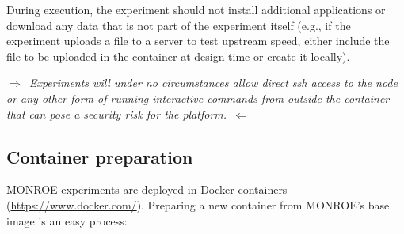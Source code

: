 \documentclass[a4paper,10pt]{article}
\newcommand{\monroe}{MONROE}
\begin{document}
During execution, the experiment should not install additional applications or download any data that is not part of the experiment itself (e.g., if the experiment uploads a file to a server to test upstream speed, either include the file to be uploaded in the container at design time or create it locally).

\emph{$\Rightarrow$~Experiments will under no circumstances allow direct ssh access to the node or any other form of running interactive commands from outside the container that can pose a security risk for the platform.~$\Leftarrow$}

\subsection{Container preparation}
\label{subsec:containerPreparation}

\monroe{} experiments are deployed in Docker containers (\url{https://www.docker.com/}).
Preparing a new container from \monroe{}'s base image is an easy process:
\end{document}
